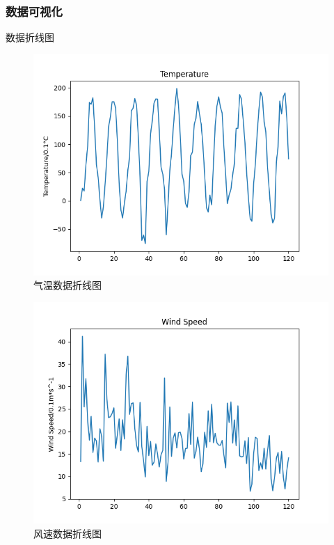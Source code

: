 \documentclass[10pt]{beamer}
\begin{document}
\begin{frame}
	\frametitle{数据可视化}
	\begin{block}{数据折线图}
		\begin{figure}[h!]
			\centering
			\includegraphics[scale=0.21]{../src/prepare_data/tg.png}
			\caption{气温数据折线图}
		\end{figure}

		\begin{figure}[h!]
			\centering
			\includegraphics[scale=0.21]{../src/prepare_data/fg.png}
			\caption{风速数据折线图}
		\end{figure}
	\end{block}
\end{frame}
\end{document}
